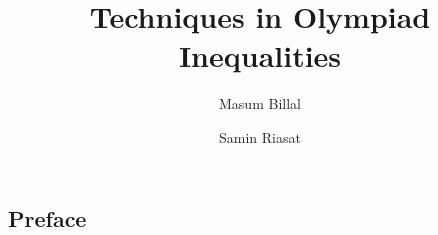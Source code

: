 \documentclass[a4paper, 12pt]{book}
\title{\bfseries Techniques in Olympiad Inequalities}
\author{Masum Billal\and Samin Riasat}
\theoremstyle{definition}
\numberwithin{problem}{chapter}
\begin{document}
	\frontmatter
	\maketitle
	\begin{refsection}
		\section*{Preface}
		\printbibliography
	\end{refsection}
	\tableofcontents
	\mainmatter
	
	\begin{refsection}
		
		
		
		
		
		
		\printbibliography
	\end{refsection}
	
	\begin{refsection}
		
		\printbibliography
	\end{refsection}

	\begin{refsection}
		
		\printbibliography
	\end{refsection}

	\begin{refsection}
		
		\printbibliography
	\end{refsection}
	
	\begin{refsection}
		
		\printbibliography
	\end{refsection}

	\begin{refsection}
		
		\printbibliography
	\end{refsection}

	\begin{refsection}
		
		\printbibliography
	\end{refsection}
	
	\begin{refsection}
		
		\printbibliography
	\end{refsection}

	\begin{refsection}
		
		\printbibliography
	\end{refsection}

	\begin{refsection}
		
		\printbibliography
	\end{refsection}
\end{document}
